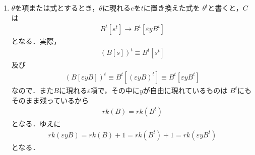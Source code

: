\begin{sketch}
\begin{description}
\begin{enumerate}
					\item $\theta$を項または式とするとき，$\theta$に現れる$e$を$t$に置き換えた式を
						$\theta^{t}$と書くと，$C$は
						\begin{align}
							B^{t}[s^{t}] \rightarrow B^{t}[\varepsilon y B^{t}]
						\end{align}
						となる．実際，
						\begin{align}
							(B[s])^{t} \equiv B^{t}[s^{t}]
						\end{align}
						及び
						\begin{align}
							(B[\varepsilon y B])^{t} \equiv
							B^{t}[(\varepsilon y B)^{t}] \equiv
							B^{t}[\varepsilon y B^{t}]
						\end{align}
						なので．また$B$に現れる$\varepsilon$項で，その中に$y$が自由に現れているものは
						$B^{t}$にもそのまま残っているから
						\begin{align}
							rk(B) = rk(B^{t})
						\end{align}
						となる．ゆえに
						\begin{align}
							rk(\varepsilon y B) = rk(B) + 1 = rk(B^{t}) + 1 = rk(\varepsilon y B^{t})
						\end{align}
						となる．
				\end{enumerate}
		\end{description}
	\end{sketch}
	
	
